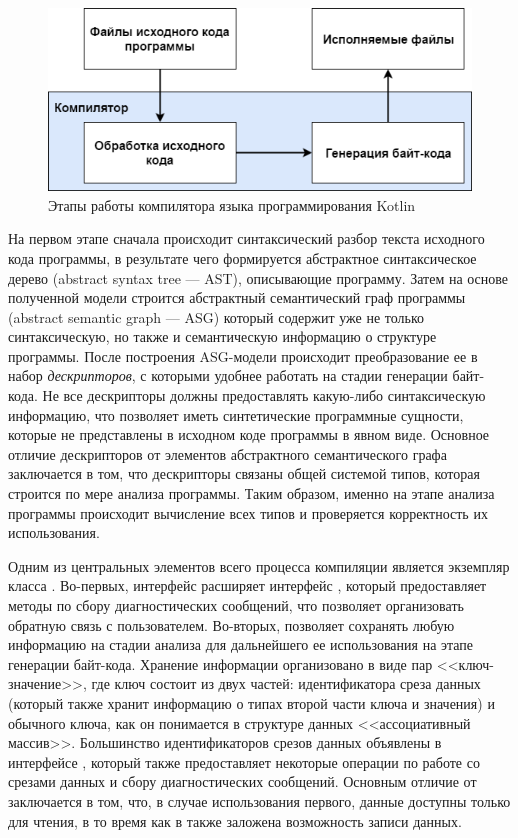 \begin{figure}[htbp]
    \centering
    \includegraphics[width=\textwidth]{resources/06/01_compiler_scheme.png}
    \caption{Этапы работы компилятора языка программирования Kotlin}
    \label{fig:compiler-scheme}
\end{figure}

На первом этапе сначала происходит синтаксический разбор текста исходного кода программы, в результате чего формируется абстрактное синтаксическое дерево (abstract syntax tree --- AST), описывающие программу. Затем на основе полученной модели строится абстрактный семантический граф программы (abstract semantic graph --- ASG) который содержит уже не только синтаксическую, но также и семантическую информацию о структуре программы. После построения ASG-модели происходит преобразование ее в набор \emph{дескрипторов}, с которыми удобнее работать на стадии генерации байт-кода. Не все дескрипторы должны предоставлять какую-либо синтаксическую информацию, что позволяет иметь синтетические программные сущности, которые не представлены в исходном коде программы в явном виде. Основное отличие дескрипторов от элементов абстрактного семантического графа заключается в том, что дескрипторы связаны общей системой типов, которая строится по мере анализа программы. Таким образом, именно на этапе анализа программы происходит вычисление всех типов и проверяется корректность их использования. 

Одним из центральных элементов всего процесса компиляции является экземпляр класса . Во-первых, интерфейс  расширяет интерфейс , который предоставляет методы по сбору диагностических сообщений, что позволяет организовать обратную связь с пользователем. Во-вторых,  позволяет сохранять любую информацию на стадии анализа для дальнейшего ее использования на этапе генерации байт-кода. Хранение информации организовано в виде пар <<ключ-значение>>, где ключ состоит из двух частей: идентификатора среза данных (который также хранит информацию о типах второй части ключа и значения) и обычного ключа, как он понимается в структуре данных <<ассоциативный массив>>. Большинство идентификаторов срезов данных объявлены в интерфейсе , который также предоставляет некоторые операции по работе со срезами данных и сбору диагностических сообщений. Основным отличие  от  заключается в том, что, в случае использования первого, данные доступны только для чтения, в то время как в  также заложена возможность записи данных. 

